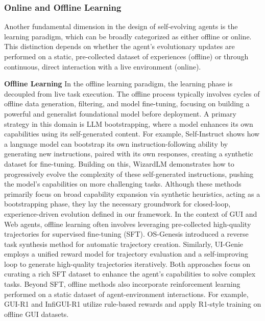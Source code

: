 \documentclass[10pt]{article} %
\begin{document}
\subsubsection{Online and Offline Learning}
Another fundamental dimension in the design of self-evolving agents is the learning paradigm, which can be broadly categorized as either offline or online. This distinction depends on whether the agent’s evolutionary updates are performed on a static, pre-collected dataset of experiences (offline) or through continuous, direct interaction with a live environment (online).

\textbf{Offline Learning}
In the offline learning paradigm, the learning phase is decoupled from live task execution. The offline process typically involves cycles of offline data generation, filtering, and model fine-tuning, focusing on building a powerful and generalist foundational model before deployment.
A primary strategy in this domain is LLM bootstrapping, where a model enhances its own capabilities using its self-generated content. For example, Self-Instruct\citep{wang2022self} shows how a language model can bootstrap its own instruction-following ability by generating new instructions, paired with its own responses, creating a synthetic dataset for fine-tuning. Building on this, WizardLM\citep{xu2024wizardlm} demonstrates how to progressively evolve the complexity of these self-generated instructions, pushing the model’s capabilities on more challenging tasks. Although these methods primarily focus on broad capability expansion via synthetic heuristics, acting as a bootstrapping phase, they lay the necessary groundwork for closed-loop, experience-driven evolution defined in our framework.
In the context of GUI and Web agents, offline learning often involves leveraging pre-collected high-quality trajectories for supervised fine-tuning (SFT). OS-Genesis\citep{sun2024genesis} introduced a reverse task synthesis method for automatic trajectory creation. Similarly, UI-Genie\citep{xiao2025ui} employs a unified reward model for trajectory evaluation and a self-improving loop to generate high-quality trajectories iteratively. Both approaches focus on curating a rich SFT dataset to enhance the agent’s capabilities to solve complex tasks.
Beyond SFT, offline methods also incorporate reinforcement learning performed on a static dataset of agent-environment interactions. For example, GUI-R1\citep{luo2025gui} and InfiGUI-R1\citep{liu2025infigui} utilize rule-based rewards and apply R1-style\citep{guo2025deepseek} training on offline GUI datasets.
\end{document}
